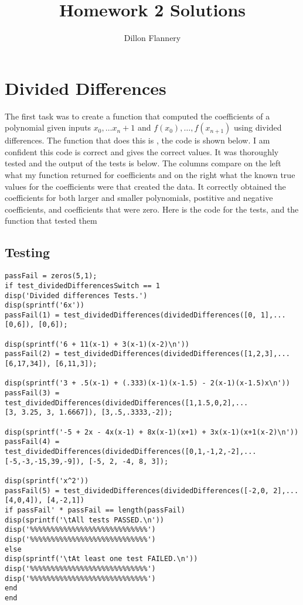 \documentclass[]{article}
\title{Homework 2 Solutions}
\author{Dillon Flannery}
\begin{document}
	
	\maketitle	
	
\section{Divided Differences} The first task was to create a function that computed the coefficients of a polynomial given inputs $ x_0, \dots x_n+1 $ and $ f(x_0), \dots, f(x_{n+1}) $ using divided differences. The function that does this is , the code is shown below. 
 I am confident this code is correct and gives the correct values. It was thoroughly tested and the output of the tests is below. The columns compare on the left what my function returned for coefficients and on the  right what the known true values for the coefficients were that created the data. It correctly obtained the coefficients for both larger and smaller polynomials, postitive and negative coefficients, and coefficients that were zero. Here is the code for the tests, and the function that tested them 
\subsection*{Testing}

\begin{lstlisting}
passFail = zeros(5,1);
if test_dividedDifferencesSwitch == 1
disp('Divided differences Tests.')
disp(sprintf('6x'))
passFail(1) = test_dividedDifferences(dividedDifferences([0, 1],...
[0,6]), [0,6]);

disp(sprintf('6 + 11(x-1) + 3(x-1)(x-2)\n'))
passFail(2) = test_dividedDifferences(dividedDifferences([1,2,3],...
[6,17,34]), [6,11,3]);

disp(sprintf('3 + .5(x-1) + (.333)(x-1)(x-1.5) - 2(x-1)(x-1.5)x\n'))
passFail(3) = test_dividedDifferences(dividedDifferences([1,1.5,0,2],...
[3, 3.25, 3, 1.6667]), [3,.5,.3333,-2]);

disp(sprintf('-5 + 2x - 4x(x-1) + 8x(x-1)(x+1) + 3x(x-1)(x+1(x-2)\n'))
passFail(4) = test_dividedDifferences(dividedDifferences([0,1,-1,2,-2],...
[-5,-3,-15,39,-9]), [-5, 2, -4, 8, 3]);

disp(sprintf('x^2'))
passFail(5) = test_dividedDifferences(dividedDifferences([-2,0, 2],...
[4,0,4]), [4,-2,1])
if passFail' * passFail == length(passFail)
disp(sprintf('\tAll tests PASSED.\n'))
disp('%%%%%%%%%%%%%%%%%%%%%%%%%%%%')
disp('%%%%%%%%%%%%%%%%%%%%%%%%%%%%')
else
disp(sprintf('\tAt least one test FAILED.\n'))
disp('%%%%%%%%%%%%%%%%%%%%%%%%%%%%')
disp('%%%%%%%%%%%%%%%%%%%%%%%%%%%%')
end
end	
\end{lstlisting}  
\end{document}
